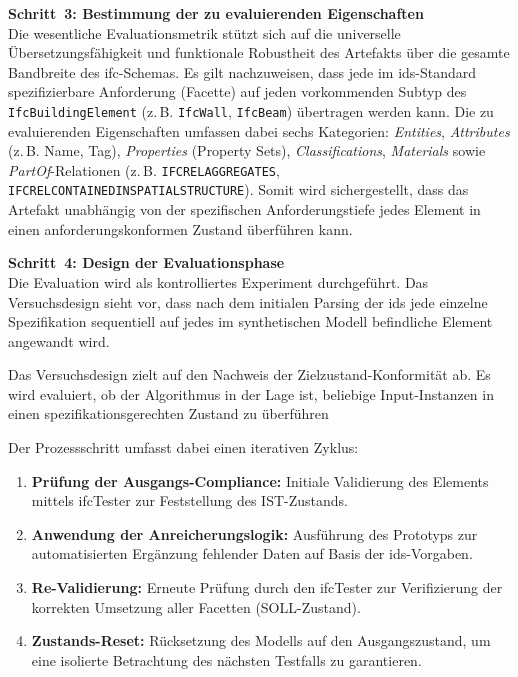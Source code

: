 \textbf{Schritt~3: Bestimmung der zu evaluierenden Eigenschaften} \\
Die wesentliche Evaluationsmetrik stützt sich auf die universelle Übersetzungsfähigkeit 
und funktionale Robustheit des Artefakts über die gesamte Bandbreite des \gls{ifc}-Schemas. 
Es gilt nachzuweisen, dass jede im \gls{ids}-Standard spezifizierbare Anforderung (Facette) 
auf jeden vorkommenden Subtyp des \texttt{IfcBuildingElement} (z.\,B. \texttt{IfcWall}, 
\texttt{IfcBeam}) übertragen werden kann. Die zu evaluierenden Eigenschaften umfassen dabei 
sechs Kategorien: \textit{Entities}, \textit{Attributes} (z.\,B. Name, Tag), 
\textit{Properties} (Property Sets), \textit{Classifications}, \textit{Materials} 
sowie \textit{PartOf}-Relationen (z.\,B. \texttt{IFCRELAGGREGATES}, 
\texttt{IFCRELCONTAINEDINSPATIALSTRUCTURE}). Somit wird sichergestellt, dass das Artefakt 
unabhängig von der spezifischen Anforderungstiefe jedes Element in einen 
anforderungskonformen Zustand überführen kann.

\textbf{Schritt~4: Design der Evaluationsphase} \\
Die Evaluation wird als kontrolliertes Experiment durchgeführt. Das Versuchsdesign sieht vor, dass nach dem initialen Parsing der \gls{ids} jede einzelne Spezifikation sequentiell auf jedes im synthetischen Modell befindliche Element angewandt wird. 

Das Versuchsdesign zielt auf den Nachweis der Zielzustand-Konformität ab. Es wird evaluiert, ob der Algorithmus in der Lage ist, beliebige Input-Instanzen in einen spezifikationsgerechten Zustand zu überführen

Der Prozessschritt umfasst dabei einen iterativen Zyklus:
\begin{enumerate}
    \item \textbf{Prüfung der Ausgangs-Compliance:} Initiale Validierung des Elements mittels \gls{ifc}Tester zur Feststellung des IST-Zustands.
    \item \textbf{Anwendung der Anreicherungslogik:} Ausführung des Prototyps zur automatisierten Ergänzung fehlender Daten auf Basis der \gls{ids}-Vorgaben.
    \item \textbf{Re-Validierung:} Erneute Prüfung durch den \gls{ifc}Tester zur Verifizierung der korrekten Umsetzung aller Facetten (SOLL-Zustand).
    \item \textbf{Zustands-Reset:} Rücksetzung des Modells auf den Ausgangszustand, um eine isolierte Betrachtung des nächsten Testfalls zu garantieren.
\end{enumerate}

